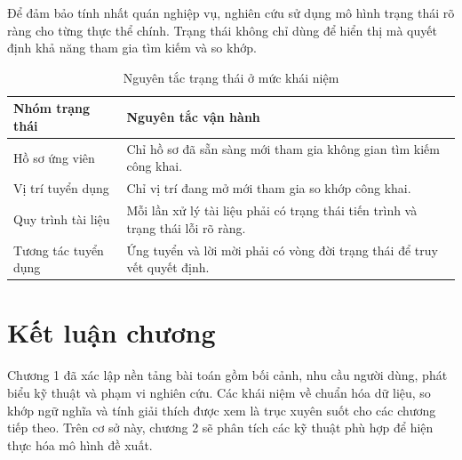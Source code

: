 Để đảm bảo tính nhất quán nghiệp vụ, nghiên cứu sử dụng mô hình trạng thái rõ ràng cho từng thực thể chính. Trạng thái không chỉ dùng để hiển thị mà quyết định khả năng tham gia tìm kiếm và so khớp.

\begin{table}[H]
\caption{Nguyên tắc trạng thái ở mức khái niệm}
\centering
\begin{tabularx}{\textwidth}{p{}X}
\toprule
\textbf{Nhóm trạng thái} & \textbf{Nguyên tắc vận hành}\\
\midrule
Hồ sơ ứng viên & Chỉ hồ sơ đã sẵn sàng mới tham gia không gian tìm kiếm công khai.\\
Vị trí tuyển dụng & Chỉ vị trí đang mở mới tham gia so khớp công khai.\\
Quy trình tài liệu & Mỗi lần xử lý tài liệu phải có trạng thái tiến trình và trạng thái lỗi rõ ràng.\\
Tương tác tuyển dụng & Ứng tuyển và lời mời phải có vòng đời trạng thái để truy vết quyết định.\\
\bottomrule
\end{tabularx}
\end{table}

\section{Kết luận chương}

Chương 1 đã xác lập nền tảng bài toán gồm bối cảnh, nhu cầu người dùng, phát biểu kỹ thuật và phạm vi nghiên cứu. Các khái niệm về chuẩn hóa dữ liệu, so khớp ngữ nghĩa và tính giải thích được xem là trục xuyên suốt cho các chương tiếp theo. Trên cơ sở này, chương 2 sẽ phân tích các kỹ thuật phù hợp để hiện thực hóa mô hình đề xuất.
